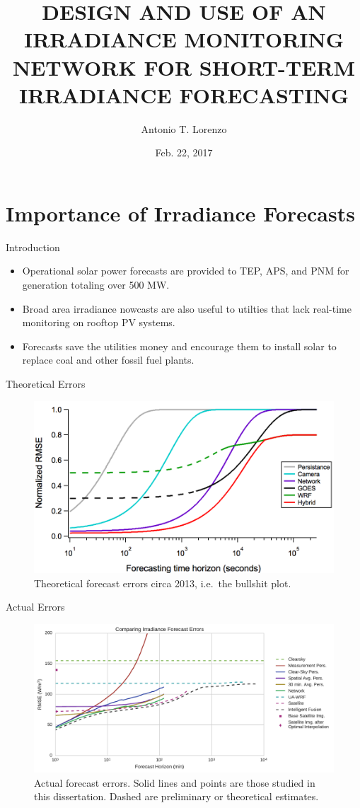 \documentclass[aspectratio=169]{beamer}
\title[Dissertation Proposal]{DESIGN AND USE OF AN IRRADIANCE
  MONITORING NETWORK FOR SHORT-TERM IRRADIANCE FORECASTING}
\author[Lorenzo]{Antonio T. Lorenzo}
\institute{University of Arizona}
\date{Feb. 22, 2017}
\begin{document}
\begin{frame}
  \titlepage
\end{frame}


\section{Importance of Irradiance Forecasts}
\label{sec:intro}

\begin{frame}{Introduction}
\begin{itemize}
\item Operational solar power forecasts are provided to TEP, APS, and
  PNM for generation totaling over 500 MW.
\item Broad area irradiance nowcasts are also useful to utilties that
  lack real-time monitoring on rooftop PV systems.
\item Forecasts save the utilities money and encourage them
  to install solar to replace coal and other fossil fuel plants.
\end{itemize}
\end{frame}

\begin{frame}{Theoretical Errors}
\begin{figure}[h]
  \includegraphics[height=.7\textheight]{figs/original_bullshit.png}
  \caption{Theoretical forecast errors circa 2013, i.e.\ the bullshit plot.}
\end{figure}
\end{frame}

\begin{frame}{Actual Errors}
\begin{figure}[h]
  \includegraphics[width=.7\textwidth]{../dissertation/figs/timehorizon.pdf}
  \caption{Actual forecast errors. Solid lines and points are those
    studied in this dissertation. Dashed are preliminary or
    theoretical estimates.}
\end{figure}
\end{frame}
\end{document}
